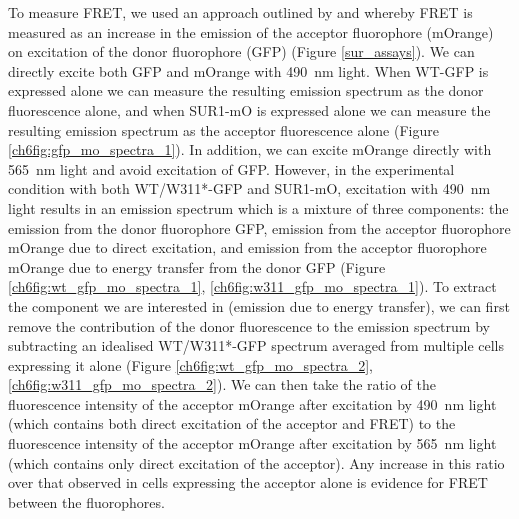 To measure FRET, we used an approach outlined by \textcite{clegg_18_1992} and \textcite{selvin_13_1995} whereby FRET is measured as an increase in the emission of the acceptor fluorophore (mOrange) on excitation of the donor fluorophore (GFP) (Figure \ref{sur_assays}).
We can directly excite both GFP and mOrange with \SI{490}{\nano\metre} light.
When WT-GFP is expressed alone we can measure the resulting emission spectrum as the donor fluorescence alone, and when SUR1-mO is expressed alone we can measure the resulting emission spectrum as the acceptor fluorescence alone (Figure \ref{ch6fig:gfp_mo_spectra_1}).
In addition, we can excite mOrange directly with \SI{565}{\nano\metre} light and avoid excitation of GFP.
However, in the experimental condition with both WT/W311*-GFP and SUR1-mO, excitation with \SI{490}{\nano\metre} light results in an emission spectrum which is a mixture of three components: the emission from the donor fluorophore GFP, emission from the acceptor fluorophore mOrange due to direct excitation, and emission from the acceptor fluorophore mOrange due to energy transfer from the donor GFP (Figure \ref{ch6fig:wt_gfp_mo_spectra_1}, \ref{ch6fig:w311_gfp_mo_spectra_1}).
To extract the component we are interested in (emission due to energy transfer), we can first remove the contribution of the donor fluorescence to the emission spectrum by subtracting an idealised WT/W311*-GFP spectrum averaged from multiple cells expressing it alone (Figure \ref{ch6fig:wt_gfp_mo_spectra_2}, \ref{ch6fig:w311_gfp_mo_spectra_2}).
We can then take the ratio of the fluorescence intensity of the acceptor mOrange after excitation by \SI{490}{\nano\metre} light (which contains both direct excitation of the acceptor and FRET) to the fluorescence intensity of the acceptor mOrange after excitation by \SI{565}{\nano\metre} light (which contains only direct excitation of the acceptor).
Any increase in this ratio over that observed in cells expressing the acceptor alone is evidence for FRET between the fluorophores.

